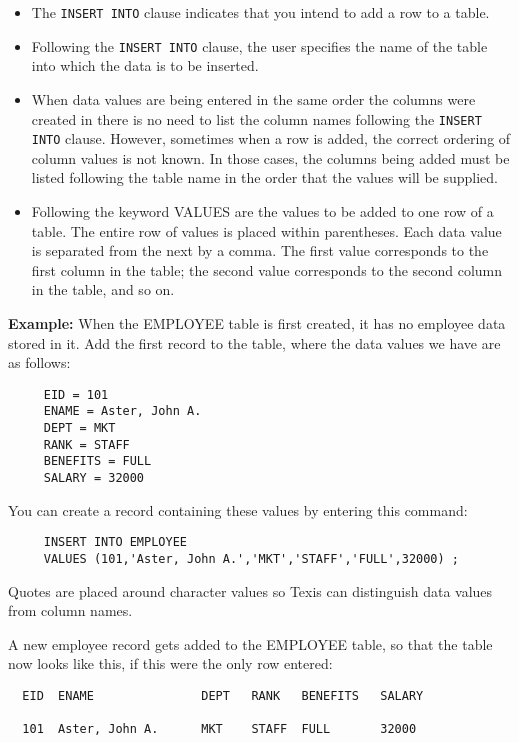 \begin{itemize}
\item The {\tt INSERT INTO} clause indicates that you intend to add a row to
a table.

\item Following the {\tt INSERT INTO} clause, the user specifies the name of
the table into which the data is to be inserted.

\item When data values are being entered in the same order the
columns were created in
there is no need to list the column names following the {\tt INSERT INTO}
clause.  However, sometimes when a row is added, the correct ordering of
column values is not known.  In those cases, the columns
being added must be listed following the table name in the order that
the values will be supplied.

\item Following the keyword VALUES are the values to be added to one
row of a table.  The entire row of values is placed within
parentheses.  Each data value is separated from the next by a comma.
The first value corresponds to the first column in the table; the
second value corresponds to the second column in the table, and so on.
\end{itemize}

{\bf Example:}
When the EMPLOYEE table is first created, it has no employee data
stored in it.  Add the first record to the table, where the data
values we have are as follows:
\begin{verbatim}
     EID = 101
     ENAME = Aster, John A.
     DEPT = MKT
     RANK = STAFF
     BENEFITS = FULL
     SALARY = 32000
\end{verbatim}
You can create a record containing these values by entering this
command:
\begin{verbatim}
     INSERT INTO EMPLOYEE
     VALUES (101,'Aster, John A.','MKT','STAFF','FULL',32000) ;
\end{verbatim}

Quotes are placed around character values so Texis can distinguish
data values from column names.

A new employee record gets added to the EMPLOYEE table, so that the
table now looks like this, if this were the only row entered:

\begin{screen}
\begin{verbatim}
  EID  ENAME               DEPT   RANK   BENEFITS   SALARY

  101  Aster, John A.      MKT    STAFF  FULL       32000


\end{verbatim}
\end{screen}

